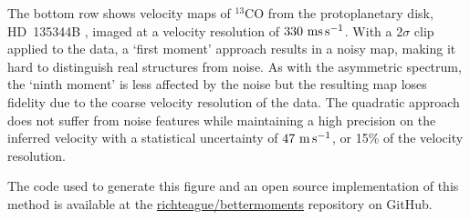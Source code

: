 \documentclass[rnaas]{aastex62}
\begin{document}
The bottom row shows velocity maps of $^{13}$CO from the protoplanetary disk, HD~135344B \citep[ALMA Project 2012.1.00158.S]{vanderMarel:2016}, imaged at a velocity resolution of $330~{\rm ms\,s^{-1}}$.
With a $2\sigma$ clip applied to the data, a `first moment' approach results in a noisy map, making it hard to distinguish real structures from noise.
As with the asymmetric spectrum, the `ninth moment' is less affected by the noise but the resulting map loses fidelity due to the coarse velocity resolution of the data.
The quadratic approach does not suffer from noise features while maintaining a high precision on the inferred velocity with a statistical uncertainty of $47~{\rm m\,s^{-1}}$, or 15\% of the velocity resolution.

The code used to generate this figure and an open source implementation of this method is available at the \href{https://github.com/richteague/bettermoments}{richteague/bettermoments} repository on GitHub.


\end{document}
